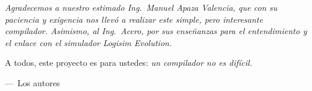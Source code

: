 \documentclass[12pt,a4paper]{report}
\begin{document}
\newpage
{}
\vspace*{\fill}
\begin{flushright}
    \begin{minipage}{0.65\textwidth}
        \itshape
        Agradecemos a nuestro estimado Ing.\ Manuel Apaza Valencia, que con
        su paciencia y exigencia nos llevó a realizar este simple, pero
        interesante compilador. Asimismo, al Ing.\ Acero, por sus enseñanzas
        para el entendimiento y el enlace con el simulador Logisim Evolution.
        
        \vspace{0.6cm}
        A todos, este proyecto es para ustedes:
        \textit{un compilador no es difícil.}
        
        \vspace{0.8cm}
        \normalfont ---\ Los autores
    \end{minipage}
\end{flushright}
\vspace*{\fill}
\newpage
{}

\tableofcontents
\listoffigures
\listoftables
\newpage










\end{document}
